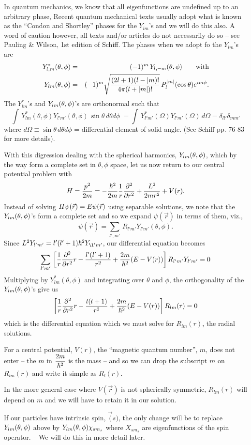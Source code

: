 In quantum mechanics, we know that all eigenfunctions are undefined up to an arbitrary phase, Recent quantum mechanical texts usually adopt what is known as the ``Condon and Shortley'' phases for the $Y_{lm}$'s and we will 
do this also. A word of caution however, all texts and/or articles do not necessarily do so -- see Pauling \& Wilson, 1st edition of Schiff. The phases when we adopt fo the $Y_{lm}$'s are
\begin{eqnarray*}
Y^*_{l,m}(\theta,\phi) &=& (-1)^m\, Y_{l,-m}(\theta,\phi) \mbox{ ~~~~ with} \\
Y_{lm}(\theta,\phi) &=& (-1)^m \sqrt{(2l+1)(l-|m)! \over 4\pi(l+|m|)!}  \, P_l^{|m|}(\cos\theta)e^{im\phi}.
\end{eqnarray*}
The $Y^*_{lm}$'s and $Y_{lm}(\theta,\phi)$'s are orthonormal such that 
\[ \int\, Y^*_{lm}(\theta,\phi) Y_{l'm'}(\theta,\phi)\, \sin\theta\, d\theta d\phi  \ = \int \, Y^*_{l'm'}(\Omega)Y_{l'm'}(\Omega)\, d\Omega = \delta_{ll'} \delta_{mm'} \]
where $d\Omega \equiv \sin\theta \, d\theta d\phi $ = differential element of solid angle. (See Schiff pp. 76-83 for more details).

With this digression dealing with the spherical harmonics, $Y_{lm}(\theta,\phi)$, which by the way form a complete set in $\theta, \phi$ space, let us now return to our central potential problem with 
\[ H = {p^2\over2m} = -{\hbar^2\over2m} {1\over r} {\partial^2 \over \partial r^2} + {L^2\over2mr^2} + V(r). \]
Instead of solving $\displaystyle H \psi(\vec{r}) = E\psi(\vec{r})$ using separable solutions, we note that the $Y_{lm}(\theta,\phi)$'s form a complete set and so we expand $\psi(\vec{r})$ in terms of them, viz.,
\[ \psi(\vec{r}) = \sum_{l',m'} \, R_{l'm'} Y_{l'm'}(\theta, \phi). \]
Since $L^2 Y_{l'm'} = l'(l'+1)\hbar^2 Y_{\l'm'}$, our differential 
equation becomes
\[ \sum_{l'm'}\, \left[ {1\over r} {\partial^2\over \partial r^2} r - {l'(l'+1)\over r^2} + {2m\over\hbar^2}(E - V(r))\right] R_{l'm'}Y_{l'm'} = 0 \]
Multiplying by $Y^*_{lm}(\theta,\phi)$ and integrating over $\theta$ and $\phi$, the orthogonality of the $Y_{lm}(\theta,\phi)$'s give us
\[ \left[ {1\over r} {\partial^2\over \partial r^2} r  -{l(l+1)\over r^2} + {2m\over\hbar^2}(E - V(r))\right] R_{lm}(r) = 0 \] which is the differential equation which we must solve for $R_{lm}(r)$, the radial solutions. 

For a central potential, $V(r)$, the ``magnetic quantum number'', $m$, does not enter -- the $m$ in $\displaystyle {2m\over\hbar^2}$ is the mass -- and so we can drop the subscript $m$ on $R_{lm}(r)$ and write it simple as $R_l(r)$.

In the more general case where $V(\vec{r})$ is not spherically symmetric, $R_{lm}(r)$ will depend on $m$ and we will have to retain it in our solution.

If our particles have intrinsic spin, $\vec(s)$, the only change will be to replace $Y_{lm}(\theta,\phi)$ above by $Y_{lm}(\theta,\phi) \chi_{sm_s}$ where $X_{sm_s}$ are eigenfunctions of the spin operator. -- We will do this in more detail later. 